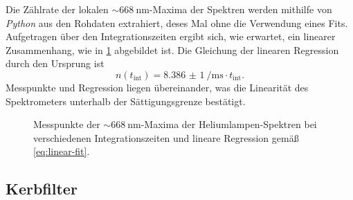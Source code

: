 \documentclass[../bericht.tex]{subfiles}
\begin{document}
        Die Zählrate der lokalen $\sim\SI{668}{\nano\meter}$-Maxima der Spektren werden mithilfe von \textit{Python} aus den Rohdaten extrahiert, deses Mal ohne die Verwendung eines Fits. Aufgetragen über den Integrationszeiten ergibt sich, wie erwartet, ein linearer Zusammenhang, wie in \cref{fig:linearitaet} abgebildet ist. Die Gleichung der linearen Regression durch den Ursprung ist
        \begin{equation}
          n(t_\mathrm{int})=\SI{8,386(1)}{\per\milli\second} \cdot t_\mathrm{int}.
          \label{eq:linear-fit}
        \end{equation}
        Messpunkte und Regression liegen übereinander, was die Linearität des Spektrometers unterhalb der Sättigungsgrenze bestätigt.

        \begin{figure}
          \caption[Messpunkte der $\sim\SI{668}{\nano\meter}$-Maxima der Heliumlampen-Spektren bei verschiedenen Integrationszeiten (vgl. \cref{fig:linearity}) und lineare Regression.]{Messpunkte der $\sim\SI{668}{\nano\meter}$-Maxima der Heliumlampen-Spektren bei verschiedenen Integrationszeiten und lineare Regression gemäß \cref{eq:linear-fit}.}
          \label{fig:linearitaet}
        \end{figure}


      \subsection{Kerbfilter}
\end{document}
